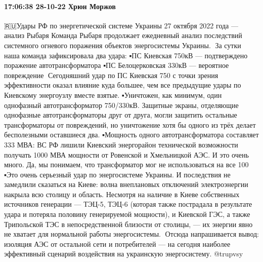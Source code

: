 \paragraph{17:06:38 28-10-22 Хрюн Моржов}

🇷🇺Удары РФ по энергетической системе Украины 27 октября 2022 года — анализ Рыбаря
Команда Рыбаря продолжает ежедневный анализ последствий системного огневого поражения объектов энергосистемы Украины.
🔻За сутки наша команда зафиксировала два удара:
▪️ПС Киевская 750кВ — подтверждено поражение автотрансформатора
▪️ПС Белоцерковская 330кВ — вероятное повреждение
🔻Сегодняшний удар по ПС Киевская 750 с точки зрения эффективности оказал влияние куда большее, чем все предыдущие удары по Киевскому энергоузлу вместе взятые.
▪️Уничтожен, как минимум, один однофазный автотрансформатор 750/330кВ. Защитные экраны, отделяющие однофазные автотрансформаторы друг от друга, могли защитить остальные трансформаторы от повреждений, но уничтожение хотя бы одного из трёх делает бесполезными оставшиеся два.
▪️Мощность одного автотрансформатора составляет 333 МВА: ВС РФ лишили Киевский энергорайон технической возможности получать 1000 МВА мощности от Ровенской и Хмельницкой АЭС. И это очень много.
Да, мы понимаем, что трансформатор мог не использоваться на все 100%
▪️Это очень серьезный удар по энергосистеме Украины. И последствия не замедлили сказаться на Киеве: волна внеплановых отключений электроэнергии накрыла всю столицу и область.
Несмотря на наличие в Киеве собственных источников генерации — ТЭЦ-5, ТЭЦ-6 (которая также пострадала в результате удара и потеряла половину генерируемой мощности), и Киевской ГЭС, а также Трипольской ТЭС в непосредственной близости от столицы, — их энергии явно не хватает для нормальной работы энергосистемы.
🔻Отсюда напрашивается вывод: изоляция АЭС от остальной сети и потребителей — на сегодня наиболее эффективный сценарий воздействия на украинскую энергосистему.
@trupvsy
